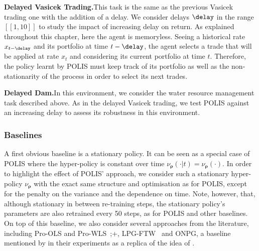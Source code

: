 \noindent\textbf{Delayed Vasicek Trading.}\indent This task is the same as the previous Vasicek trading one with the addition of a delay.
We consider delays $\delay$ in the range $[\![1,10]\!]$ to study the impact of increasing delay on return. 
As explained throughout this chapter, here the agent is memoryless. 
Seeing a historical rate $x_{t-\delay}$ and its portfolio at time $t-\delay$, the agent selects a trade that will be applied at rate $x_t$ and considering its current portfolio at time $t$. 
Therefore, the policy learnt by POLIS must keep track of its portfolio as well as the non-stationarity of the process in order to select its next trades.

\noindent\textbf{Delayed Dam.}\indent In this environment, we consider the water resource management task described above. 
As in the delayed Vasicek trading, we test POLIS against an increasing delay to assess its robustness in this environment. 

\subsubsection{Baselines}
A first obvious baseline is a stationary policy. 
It can be seen as a special case of POLIS where the hyper-policy is constant over time $\nu_{\boldsymbol\rho}(\cdot\vert t)=\nu_{\boldsymbol\rho}(\cdot)$. 
In order to highlight the effect of POLIS' approach, we consider such a stationary hyper-policy $\nu_{\boldsymbol\rho}$ with the exact same structure and optimisation as for POLIS, except for the penalty on the variance and the dependence on time.
Note, however, that, although stationary in between re-training steps, the stationary policy's parameters are also retrained every 50 steps, as for POLIS and other baselines. 
On top of this baseline, we also consider several approaches from the literature, including Pro-OLS and Pro-WLS~\cite{chandak2020optimizing};+, LPG-FTW~\cite{mendez2020lifelong} and ONPG, a baseline mentioned by \cite{chandak2020optimizing} in their experiments as a replica of the idea of \cite{al-shedivat2018continuous}.


